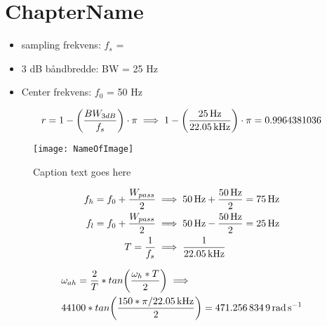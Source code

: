 
\chapter*{ChapterName}
\setcounter{chapter}{1}
\setcounter{section}{0}
\thispagestyle{fancy} %
\label{ch:ChapterReference}

\begin{itemize}
    \item sampling frekvens: $f_s$ = \FS 
    \item 3 dB båndbredde: BW = 25 Hz
    \item Center frekvens: $f_0$ = 50 Hz
\end{itemize}

\begin{equation}
    r = 1 -\bigg(\frac{BW_{3dB}}{f_s}\bigg)\cdot\pi \implies
    1-\bigg(\frac{\SI{25}{\hertz}}{\SI{22.05}{\kilo\hertz}}\bigg)\cdot\pi = 0.9964381036
\end{equation}

\begin{figure}[H]%
\center
\texttt{[image: NameOfImage]}
\caption{Caption text goes here}
\label{fig:Reference}
\end{figure}

\begin{align}
   f_h = f_0 + \frac{W_{pass}}{2} &\implies \SI{50}{\hertz} + \frac{\SI{50}{\hertz}}{2} = \SI{75}{\hertz}\\
   f_l = f_0 + \frac{W_{pass}}{2} &\implies \SI{50}{\hertz} - \frac{\SI{50}{\hertz}}{2} = \SI{25}{\hertz}\\
   T=\frac{1}{f_s} &\implies \frac{1}{\SI{22.05}{\kilo\hertz}}
\end{align}

\begin{equation}
\begin{aligned}
  &\omega_{ah} = \frac{2}{T}*tan\bigg(\frac{\omega_h*T}{2}\bigg) \implies\\ &44100*tan\bigg(\frac{150*\pi/\SI{22.05}{\kilo\hertz}}{2}\bigg) = \SI{471.2568349}{\radian\per\second}
  \end{aligned}
\end{equation}

